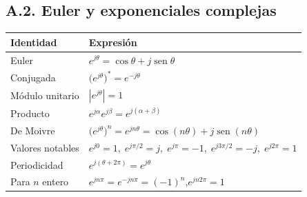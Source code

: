 \documentclass[11pt,a4paper]{article}
\DeclareMathOperator{\sen}{sen}
\begin{document}
\subsection*{A.2. Euler y exponenciales complejas}
\begin{table}[H]
\centering
\renewcommand{\arraystretch}{1.5}
\begin{tabularx}{\textwidth}{>{\raggedright\arraybackslash}p{4.4cm}X}
\toprule
\textbf{Identidad} & \textbf{Expresión}\\
\midrule
Euler & $e^{j\theta}=\cos\theta+j\sen\theta$\\
Conjugada & $\big(e^{j\theta}\big)^{*}=e^{-j\theta}$\\
Módulo unitario & $|e^{j\theta}|=1$\\
Producto & $e^{j\alpha}e^{j\beta}=e^{j(\alpha+\beta)}$\\
De Moivre & $\big(e^{j\theta}\big)^{n}=e^{jn\theta}=\cos(n\theta)+j\sen(n\theta)$\\
Valores notables & $e^{j0}=1,\;e^{j\pi/2}=j,\;e^{j\pi}=-1,\;e^{j3\pi/2}=-j,\;e^{j2\pi}=1$\\
Periodicidad & $e^{j(\theta+2\pi)}=e^{j\theta}$\\
Para $n$ entero & $e^{jn\pi}=e^{-jn\pi}=(-1)^{n}$,\quad $e^{jn2\pi}=1$\\
\bottomrule
\end{tabularx}
\end{table}
\end{document}
